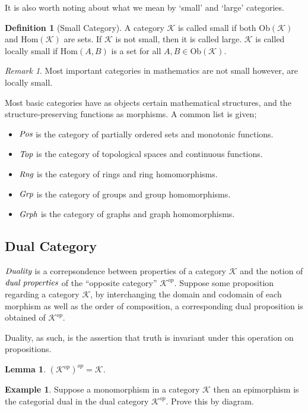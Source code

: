\documentclass[10pt, oneside, reqno]{amsart}
\theoremstyle{plain}%
\newtheorem{lem}[thm]{Lemma}
\theoremstyle{definition}
\newtheorem{defn}[thm]{Definition}
\newtheorem{exmp}[thm]{Example}
\theoremstyle{remark}
\newtheorem*{rem}{Remark}
\newcommand{\Cat}{\mathcal{K}}
\begin{document}
It is also worth noting about what we mean by `small' and `large' categories.

\begin{defn}[Small Category]
	A category $\Cat$ is called small if both $\text{Ob}(\Cat)$ and $\text{Hom}(\Cat)$ are sets.
	If $\Cat$ is not small, then it is called large.
	$\Cat$ is called locally small if $\text{Hom}(A,B)$ is a set for all $A, B \in \text{Ob}(\Cat)$.
\end{defn}

\begin{rem}
	Most important categories in mathematics are not small however, are locally small.
\end{rem}

Most basic categories have as objects certain mathematical structures, and the structure-preserving
functions as morphisms. A common list is given;
\begin{itemize}
\item $\emph{Pos}$ is the category of partially ordered sets and monotonic functions.
\item $\emph{Top}$ is the category of topological spaces and continuous functions.
\item $\emph{Rng}$ is the category of rings and ring homomorphisms.
\item $\emph{Grp}$ is the category of groups and group homomorphisms.
\item $\emph{Grph}$ is the category of graphs and graph homomorphisms.
\end{itemize}

\subsection{Dual Category} %
\label{subsec:dualcategory}
$\emph{Duality}$ is a correpsondence between properties of a category $\mathcal{K}$ and the notion
of $\emph{dual properties}$ of the ``opposite category'' $\mathcal{K}^{op}$. Suppose some proposition
regarding a category $\mathcal{K}$, by interchanging the domain and codomain of each morphism as well as
the order of composition, a corresponding dual proposition is obtained of $\mathcal{K}^{op}$.

Duality, as such, is the assertion that truth is invariant under this operation on propositions.
\begin{lem}
 $(\mathcal{K}^{op})^{op} = \mathcal{K}$.
\end{lem}

\begin{exmp}
 Suppose a monomorphism in a category $\mathcal{K}$ then an epimorphism is the categorial dual
 in the dual category $\mathcal{K}^{op}$. Prove this by diagram.
\end{exmp}
\end{document}
